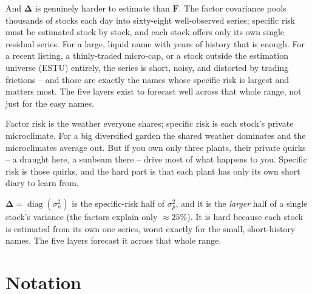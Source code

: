 \documentclass[11pt]{article}
\theoremstyle{definition}
\theoremstyle{plain}
\theoremstyle{remark}
\DeclareMathOperator{\diag}{diag}
\newcommand{\Fmat}{\mathbf{F}}
\newcommand{\Del}{\boldsymbol{\Delta}}
\begin{document}
And $\Del$ is genuinely harder to estimate than $\Fmat$. The factor covariance pools thousands of stocks each day into sixty-eight well-observed series; specific risk must be estimated stock by stock, and each stock offers only its own single residual series. For a large, liquid name with years of history that is enough. For a recent listing, a thinly-traded micro-cap, or a stock outside the estimation universe (ESTU) entirely, the series is short, noisy, and distorted by trading frictions -- and those are exactly the names whose specific risk is largest and matters most. The five layers exist to forecast well across that whole range, not just for the easy names.

\begin{intuition}
Factor risk is the weather everyone shares; specific risk is each stock's private microclimate. For a big diversified garden the shared weather dominates and the microclimates average out. But if you own only three plants, their private quirks -- a draught here, a sunbeam there -- drive most of what happens to you. Specific risk is those quirks, and the hard part is that each plant has only its own short diary to learn from.
\end{intuition}

\begin{keyresult}
$\Del=\diag(\sigma_n^2)$ is the specific-risk half of $\sigma_p^2$, and it is the \emph{larger} half of a single stock's variance (the factors explain only $\approx 25\%$). It is hard because each stock is estimated from its own one series, worst exactly for the small, short-history names. The five layers forecast it across that whole range.
\end{keyresult}

\section*{Notation}
\end{document}
